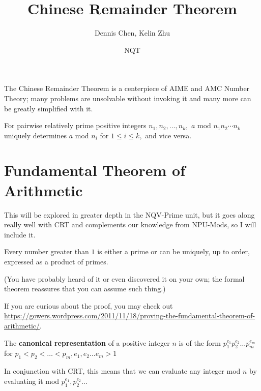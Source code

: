 \documentclass[mast]{lucky}
\title{Chinese Remainder Theorem}
\author{Dennis Chen, Kelin Zhu}
\date{NQT}
\begin{document}
\maketitle

The Chinese Remainder Theorem is a centerpiece of AIME and AMC Number Theory; many problems are unsolvable without invoking it and many more can be greatly simplified with it.

\begin{theo}
For pairwise relatively prime positive integers $n_1,n_2,\ldots,n_k,$ $a$ mod $n_1n_2\cdots n_k$ uniquely determines $a$ mod $n_i$ for $1\leq i\leq k,$ and vice versa.
\end{theo}

\section{Fundamental Theorem of Arithmetic}
This will be explored in greater depth in the NQV-Prime unit, but it goes along really well with CRT and complements our knowledge from NPU-Mods, so I will include it.

\begin{theo}
Every number greater than $1$ is either a prime or can be uniquely, up to order, expressed as a product of primes.

(You have probably heard of it or even discovered it on your own; the formal theorem reassures that you can assume such thing.)
\end{theo}

If you are curious about the proof, you may check out \url{https://gowers.wordpress.com/2011/11/18/proving-the-fundamental-theorem-of-arithmetic/}.

\begin{fact}
The \textbf{canonical representation} of a positive integer $n$ is of the form $p_1^{e_1}p_2^{e_2}\ldots p_m^{e_m}$ for $p_1<p_2<\ldots <p_m, e_1,e_2\ldots e_m>1$ 
\end{fact}

In conjunction with CRT, this means that we can evaluate any integer mod $n$ by evaluating it mod $p_1^{e_1},p_2^{e_2}\ldots$
\end{document}
